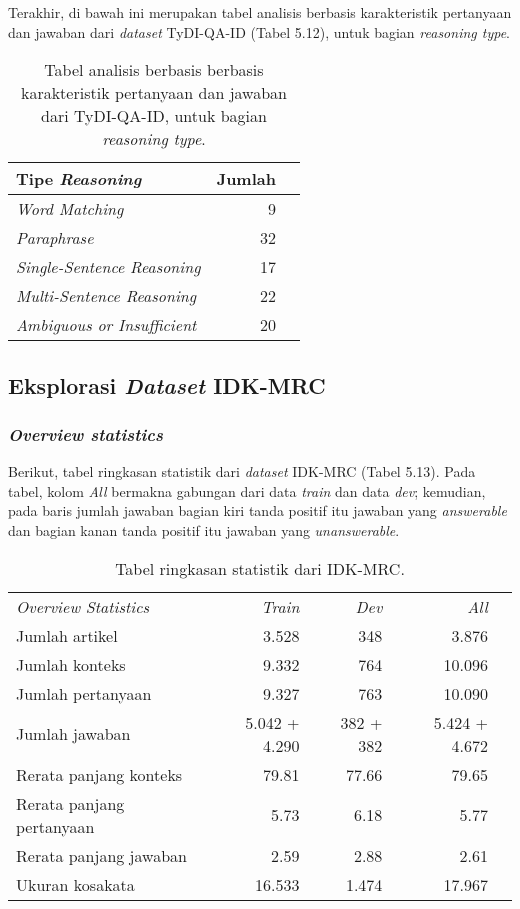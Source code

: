 Terakhir, di bawah ini merupakan tabel analisis berbasis karakteristik pertanyaan dan jawaban dari \emph{dataset} TyDI-QA-ID (Tabel 5.12), untuk bagian \emph{reasoning type}.

\begin{table}[H]\centering
\begin{tabular}{lrr}\toprule
Tipe \emph{Reasoning} &Jumlah \\\midrule
\emph{Word Matching} & 9\\
\emph{Paraphrase} & 32\\
\emph{Single-Sentence Reasoning} & 17\\
\emph{Multi-Sentence Reasoning} & 22\\
\emph{Ambiguous or Insufficient} & 20\\
\bottomrule
\end{tabular}
\caption{Tabel analisis berbasis berbasis karakteristik pertanyaan dan jawaban dari TyDI-QA-ID, untuk bagian \emph{reasoning type}.}
\end{table}

\subsection{Eksplorasi \emph{Dataset} IDK-MRC}

\subsubsection{\emph{Overview statistics}}
Berikut, tabel ringkasan statistik dari \emph{dataset} IDK-MRC (Tabel 5.13). Pada tabel, kolom \emph{All} bermakna gabungan dari data \emph{train} dan data \emph{dev}; kemudian, pada baris jumlah jawaban bagian kiri tanda positif itu jawaban yang \emph{answerable} dan bagian kanan tanda positif itu jawaban yang \emph{unanswerable}.

\begin{table}[H]\centering
\begin{tabular}{lrrrr}\toprule
\emph{Overview Statistics} &\emph{Train} &\emph{Dev} &\emph{All} \\
Jumlah artikel &3.528 &348 &3.876 \\
Jumlah konteks &9.332 &764 &10.096 \\
Jumlah pertanyaan &9.327 &763 &10.090 \\
Jumlah jawaban &5.042 + 4.290 &382 + 382 &5.424 + 4.672 \\
Rerata panjang konteks &79.81 &77.66 &79.65 \\
Rerata panjang pertanyaan &5.73 &6.18 &5.77 \\
Rerata panjang jawaban &2.59 &2.88 &2.61 \\
Ukuran kosakata &16.533 &1.474 &17.967 \\
\bottomrule
\end{tabular}
\caption{Tabel ringkasan statistik dari IDK-MRC.}
\end{table}


